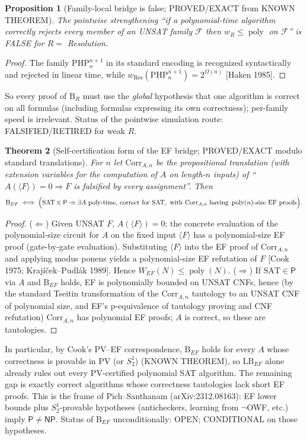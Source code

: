 \documentclass[11pt]{article}
\newtheorem{theorem}{Theorem}
\newtheorem{proposition}[theorem]{Proposition}
\newcommand{\SAT}{\mathrm{SAT}}
\newcommand{\Pc}{\mathsf P}
\newcommand{\NP}{\mathsf{NP}}
\newcommand{\poly}{\operatorname{poly}}
\begin{document}
\begin{proposition}[Family-local bridge is false; PROVED/EXACT from KNOWN THEOREM]\label{p:local}
The pointwise strengthening ``if a polynomial-time algorithm correctly
rejects every member of an UNSAT family $\mathcal F$ then $w_R\le\poly$ on
$\mathcal F$'' is FALSE for $R=$ Resolution.
\end{proposition}
\begin{proof}
The family $\mathrm{PHP}^{n+1}_n$ in its standard encoding is recognized
syntactically and rejected in linear time, while
$w_{\mathrm{Res}}(\mathrm{PHP}^{n+1}_n)=2^{\Omega(n)}$ [Haken 1985].
\end{proof}
So every proof of $\mathrm B_R$ must use the \emph{global} hypothesis that one
algorithm is correct on all formulas (including formulas expressing its own
correctness); per-family speed is irrelevant. Status of the pointwise
simulation route: FALSIFIED/RETIRED for weak $R$.

\begin{theorem}[Self-certification form of the EF bridge; PROVED/EXACT modulo
standard translations]\label{t:self}
For $n$ let $\mathrm{Corr}_{A,n}$ be the propositional translation (with
extension variables for the computation of $A$ on length-$n$ inputs) of
``$A(\langle F\rangle)=0\Rightarrow F$ is falsified by every assignment''.
Then
\[
 \mathrm B_{EF}\iff\Bigl(\SAT\in\Pc\Rightarrow\exists A\text{ poly-time, correct
 for }\SAT,\ \text{with }\mathrm{Corr}_{A,n}\text{ having }\poly(n)\text{-size EF proofs}\Bigr).
\]
\end{theorem}
\begin{proof}
($\Leftarrow$) Given UNSAT $F$, $A(\langle F\rangle)=0$; the concrete
evaluation of the polynomial-size circuit for $A$ on the fixed input
$\langle F\rangle$ has a polynomial-size EF proof (gate-by-gate evaluation).
Substituting $\langle F\rangle$ into the EF proof of $\mathrm{Corr}_{A,n}$ and
applying modus ponens yields a polynomial-size EF refutation of $F$
[Cook 1975; Krajíček--Pudlák 1989]. Hence $W_{EF}(N)\le\poly(N)$.
($\Rightarrow$) If $\SAT\in\Pc$ via $A$ and $\mathrm B_{EF}$ holds, EF is
polynomially bounded on UNSAT CNFs, hence (by the standard Tseitin
transformation of the $\mathrm{Corr}_{A,n}$ tautology to an UNSAT CNF of
polynomial size, and EF's p-equivalence of tautology proving and CNF
refutation) $\mathrm{Corr}_{A,n}$ has polynomial EF proofs; $A$ is correct, so
these are tautologies.
\end{proof}
In particular, by Cook's PV--EF correspondence, $\mathrm B_{EF}$ holds for
every $A$ whose correctness is provable in $\mathrm{PV}$ (or $S^1_2$)
(KNOWN THEOREM), so $\mathrm{LB}_{EF}$ alone already rules out every
$\mathrm{PV}$-certified polynomial SAT algorithm. The remaining gap is exactly
correct algorithms whose correctness tautologies lack short EF proofs.
This is the frame of Pich--Santhanam (arXiv:2312.08163): EF lower bounds plus
$S^1_2$-provable hypotheses (anticheckers, learning from $\neg$OWF, etc.)
imply $\Pc\ne\NP$. Status of $\mathrm B_{EF}$ unconditionally: OPEN;
CONDITIONAL on those hypotheses.
\end{document}

